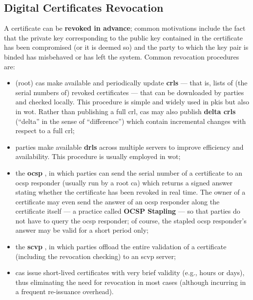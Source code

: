 \subsection{Digital Certificates Revocation}\label{sec:binding_keys_to_parties:revocation}

A certificate can be \textbf{revoked in advance}; common motivations include the fact that the private key corresponding to the public key contained in the certificate has been compromised (or it is deemed so) and the party to which the key pair is binded has misbehaved or has left the system. Common revocation procedures are:

\begin{itemize}
	\item (root) \glspl{ca} make available and periodically update \textbf{\glspl{crl}} --- that is, lists of (the serial numbers of) revoked certificates --- that can be downloaded by parties and checked locally. This procedure is simple and widely used in \glspl{pki} but also in \gls{wot}. Rather than publishing a full \gls{crl}, \glspl{ca} may also publish \textbf{delta \glspl{crl}} (``delta'' in the sense of ``difference'') which contain incremental changes with respect to a full \gls{crl};
	\item parties make available \textbf{\glspl{drl}} across multiple servers to improve efficiency and availability. This procedure is usually employed in \gls{wot};
	\item the \textbf{\gls{ocsp}} \cite{rfc6960}, in which parties can send the serial number of a certificate to an \gls{ocsp} responder (usually run by a root \gls{ca}) which returns a signed answer stating whether the certificate has been revoked in real time. The owner of a certificate may even send the answer of an \gls{ocsp} responder along the certificate itself --- a practice called \textbf{OCSP Stapling} --- so that parties do not have to query the \gls{ocsp} responder; of course, the stapled \gls{ocsp} responder's answer may be valid for a short period only;
	\item the \textbf{\gls{scvp}} \cite{rfc5055}, in which parties offload the entire validation of a certificate (including the revocation checking) to an \gls{scvp} server;
	\item \glspl{ca} issue short-lived certificates with very brief validity (e.g., hours or days), thus eliminating the need for revocation in most cases (although incurring in a frequent re-issuance overhead).
\end{itemize}

